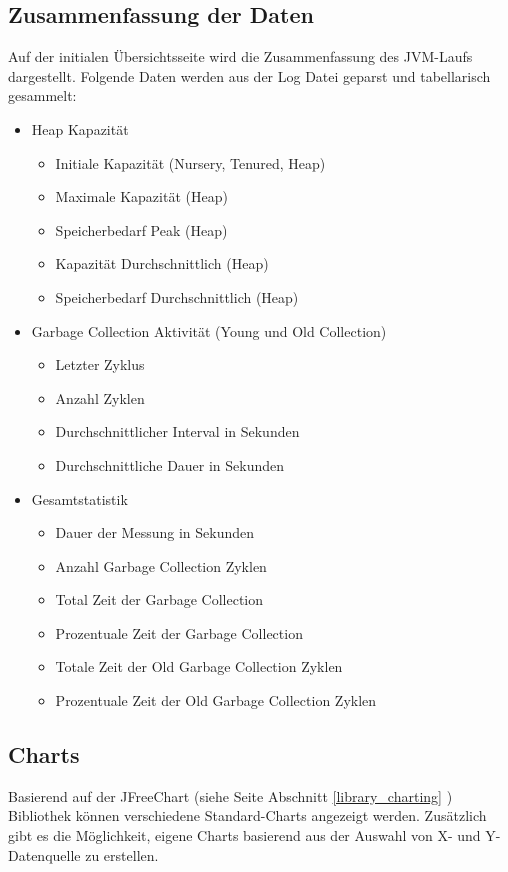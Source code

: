 \subsection{Zusammenfassung der Daten}
Auf der initialen Übersichtsseite wird die Zusammenfassung des JVM-Laufs dargestellt. Folgende Daten werden aus der Log Datei geparst und tabellarisch gesammelt:
\begin{itemize}
	\item Heap Kapazität
	\begin{itemize}
		\item Initiale Kapazität (Nursery, Tenured, Heap)
		\item Maximale Kapazität (Heap)
		\item Speicherbedarf Peak (Heap)
		\item Kapazität Durchschnittlich (Heap)
		\item Speicherbedarf Durchschnittlich (Heap)
	\end{itemize}
	\item Garbage Collection Aktivität (Young und Old Collection)
	\begin{itemize}
		\item Letzter Zyklus
		\item Anzahl Zyklen
		\item Durchschnittlicher Interval in Sekunden
		\item Durchschnittliche Dauer in Sekunden		
	\end{itemize}	
	\item Gesamtstatistik
	\begin{itemize}
		\item Dauer der Messung in Sekunden
		\item Anzahl Garbage Collection Zyklen
		\item Total Zeit der Garbage Collection
		\item Prozentuale Zeit der Garbage Collection
		\item Totale Zeit der Old Garbage Collection Zyklen
		\item Prozentuale Zeit der Old Garbage Collection Zyklen
	\end{itemize}
\end{itemize}

\subsection{Charts}
Basierend auf der JFreeChart (siehe Seite \pageref{library_charting} Abschnitt \ref{library_charting} ) Bibliothek können verschiedene Standard-Charts angezeigt werden. Zusätzlich gibt es die Möglichkeit, eigene Charts basierend aus der Auswahl von X- und Y-Datenquelle zu erstellen. 


